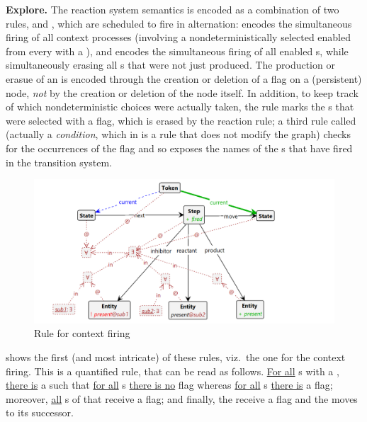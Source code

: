 \medskip\noindent\textbf{Explore.}
%
The reaction system semantics is encoded as a combination of two rules, \contextR and \reactR, which are scheduled to fire in alternation: \contextR encodes the simultaneous firing of all context processes (involving a nondeterministically selected enabled \Step from every \State with a \Token), and \reactR encodes the simultaneous firing of all enabled \Reaction{}s, while simultaneously erasing all \Entity{}s that were not just produced. The production or erasue of an \Entity is encoded through the creation or deletion of a \present flag on a (persistent) \Entity node, \emph{not} by the creation or deletion of the node itself. In addition, to keep track of which nondeterministic choices were actually taken, the \contextR rule marks the \Step{}s that were selected with a \fired flag, which is erased by the reaction rule; a third rule called \firedR (actually a \emph{condition}, which in \GROOVE is a rule that does not modify the graph) checks for the occurrences of the \fired flag and so exposes the names of the \Rule{}s that have fired in the transition system.

\begin{figure}
\centering
\includegraphics[scale=.2]{figs/context}
\caption{Rule for context firing}
\label{fig:context}
\end{figure}
%
 shows the first (and most intricate) of these rules, viz.\ the one for the context firing. This is a quantified rule, that can be read as follows. \uline{For all} \State{}s with a \Token, \uline{there is} a \nextt{} \Step such that \uline{for all} \inhibitor{}s \uline{there is no} \present flag whereas \uline{for all} \reactant{}s \uline{there is} a \present flag; moreover, \uline{all} \product{}s of that \Step receive a \present flag; and finally, the \Step receive a \fired flag and the \Token moves to its successor.

